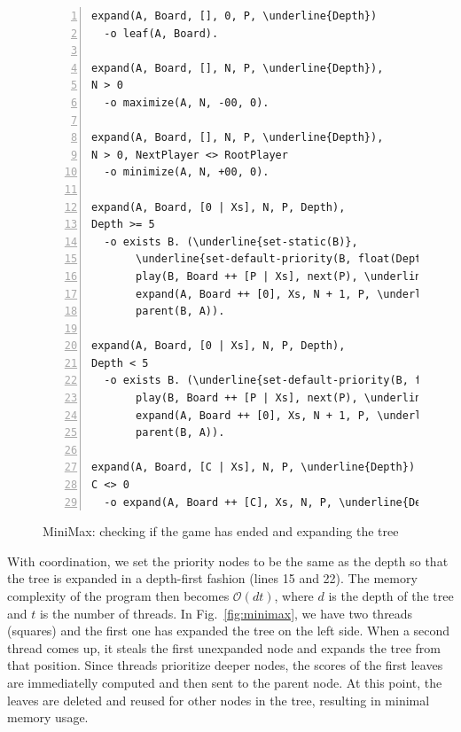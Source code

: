 \begin{figure}[h!]
\scriptsize\begin{Verbatim}[numbers=left,commandchars=\\\{\}]
expand(A, Board, [], 0, P, \underline{Depth})
  -o leaf(A, Board).

expand(A, Board, [], N, P, \underline{Depth}),
N > 0
  -o maximize(A, N, -00, 0).

expand(A, Board, [], N, P, \underline{Depth}),
N > 0, NextPlayer <> RootPlayer
  -o minimize(A, N, +00, 0).

expand(A, Board, [0 | Xs], N, P, Depth),
Depth >= 5
  -o exists B. (\underline{set-static(B)},
       \underline{set-default-priority(B, float(Depth + 1))},
       play(B, Board ++ [P | Xs], next(P), \underline{Depth + 1}),
       expand(A, Board ++ [0], Xs, N + 1, P, \underline{Depth}),
       parent(B, A)).

expand(A, Board, [0 | Xs], N, P, Depth),
Depth < 5
  -o exists B. (\underline{set-default-priority(B, float(Depth + 1))},
       play(B, Board ++ [P | Xs], next(P), \underline{Depth + 1}),
       expand(A, Board ++ [0], Xs, N + 1, P, \underline{Depth}),
       parent(B, A)).

expand(A, Board, [C | Xs], N, P, \underline{Depth})
C <> 0
  -o expand(A, Board ++ [C], Xs, N, P, \underline{Depth}).
\end{Verbatim}
\caption{MiniMax: checking if the game has ended and expanding the tree}
\label{minimax:check-end}
\end{figure}
\normalsize

With coordination, we set the priority nodes to be the same as the
depth so that the tree is expanded in a depth-first fashion (lines 15 and 22).
The memory complexity of the program then becomes $\mathcal{O}(d t)$, where $d$
is the depth of the tree and $t$ is the number of threads. In
Fig.~\ref{fig:minimax}, we have two threads (squares) and the first one has
expanded the tree on the left side. When a second thread comes up, it steals the
first unexpanded node and expands the tree from that position. Since threads
prioritize deeper nodes, the scores of the first leaves are immediatelly
computed and then sent to the parent node. At this point, the leaves are deleted
and reused for other nodes in the tree, resulting in minimal memory usage.

